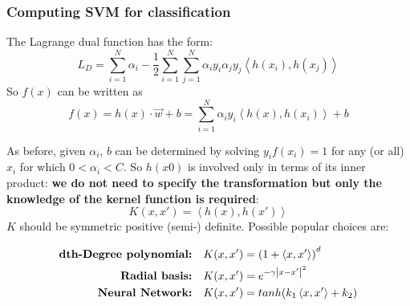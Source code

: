 \subsubsection{Computing SVM for classification}
The Lagrange dual function has the form:
\begin{equation}
L_D = \sum_{i=1}^N \alpha_i - \frac{1}{2}\sum_{i=1}^N\sum_{j=1}^N \alpha_i y_i \alpha_j y_j\left\langle  h(x_i), h(x_j)  \right\rangle 
\end{equation}
So $f(x)$ can be written as 
\begin{equation}
f(x) = h(x)\cdot\vec{w} + b = \sum_{i=1}^N \alpha_iy_i \left\langle  h(x), h(x_i)  \right\rangle +b
\end{equation}

As before, given $\alpha_i$, $b$ can be determined by solving $y_i f(x_i) = 1$ for any (or all) $x_i$ for which $0<\alpha_i <C$.
So $h(x0)$ is involved only in terms of its inner product: \textbf{we do not need to specify the transformation but only the knowledge of the kernel function is required}:
\begin{equation}
K(x, x') = \left\langle  h(x), h(x')  \right\rangle
\end{equation}
$K$ should be symmetric positive (semi-) definite.   Possible popular choices are:

\begin{equation}
\begin{aligned}
\textbf{dth-Degree polynomial:} &\quad K(x, x') = \br{1+\left\langle  x,x'  \right\rangle}^d\\
\textbf{Radial basis:} &\quad K(x, x') =e^{-\gamma\left| x-x' \right|^2}\\
\textbf{Neural Network:} &\quad K(x, x') = tanh\br{k_1\left\langle  x,x'  \right\rangle+k_2}\\
\end{aligned}
\end{equation}
